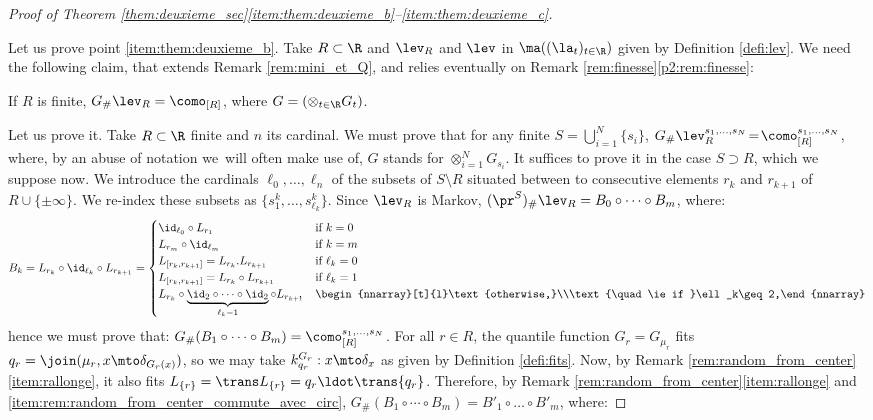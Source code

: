 \begin{proof}[Proof of Theorem \ref{them:deuxieme_sec}\eqref{item:them:deuxieme_b}--\eqref{item:them:deuxieme_c}]\label{proof:them:deuxieme}

Let us prove point \eqref{item:them:deuxieme_b}. Take $R\subset\R$ and $\lev_R$ and $\lev$ in $\ma((\la_t)_{t\in\R})$ given by Definition \ref{defi:lev}. We need the following claim, that extends Remark \ref{rem:mini_et_Q}, and relies eventually on Remark \ref{rem:finesse}\eqref{p2:rem:finesse}:

\begin{claim}
If $R$ is finite, $G_\#\lev_{R}=\como_{[R]}$, where $G=(\otimes_{t\in\R} G_t)$.
\end{claim}

Let us prove it. Take $R\subset\R$ finite and $n$ its cardinal. We must prove that for any finite $S\!=\!\bigcup_{i=1}^N\{s_i\}$, $G_\#\lev_R^{s_1,\ldots,s_N}\!=\!\como_{[R]}^{s_1,\ldots,s_N}$, where, by an abuse of notation we~will often make use of, $G$ stands for $\otimes_{i=1}^N G_{s_i}$. It suffices to prove it in the case $S\supset R$, which we suppose now. We introduce the cardinals $\ell_0,\ldots,\ell_n$ of the subsets of $S\setminus R$ situated between to consecutive elements $r_k$ and $r_{k+1}$ of $R\cup\{\pm\infty\}$. We re-index these subsets as $\{s_1^k,\ldots,s_{\ell_k}^k\}$. Since $\lev_R$ is Markov, $(\pr^S)_\#\lev_R=B_0\circ\cdots\circ B_m$, where:
\begin{align*}
B_k=L_{r_{k}}\circ\id_{\ell_{k}}\circ L_{r_{k+1}}=
\begin{cases}
\id_{\ell_0}\circ L_{r_1}&\text{if }k=0\\
L_{r_m}\circ \id_{\ell_m}&\text{if }k=m\\
L_{[r_k,r_{k+1}]}=L_{r_{k}}. L_{r_{k+1}}&\text{if }\ell_k=0\\
L_{[r_k,r_{k+1}]}=L_{r_{k}}\circ L_{r_{k+1}}&\text{if }\ell_k=1\\
L_{r_{k}}\circ\underbrace{\id_2\circ\cdots\circ\id_2}_{\ell_k-1}\circ L_{r_{k+1}}&\begin{nnarray}[t]{l}\text{otherwise,}\\\text{\quad \ie if }\ell_k\geq 2,\end{nnarray}
\end{cases}
\end{align*}
hence we must prove that: $G_\#(B_1\circ\cdots\circ B_m)=\como_{[R]}^{s_1,\ldots,s_N}$. For all $r\in R$, the quantile function $G_r=G_{\mu_r}$ fits $q_r=\join(\mu_r,x\mto \delta_{G_r(x)})$, so we may take $k^{G_r}_{q_r}:x\mto \delta_x$ as given by Definition \ref{defi:fits}. Now, by Remark \ref{rem:random_from_center}\eqref{item:rallonge}, it also fits $L_{\{r\}}=\trans L_{\{r\}}=q_r\ldot\trans{q_r}$. Therefore, by Remark \ref{rem:random_from_center}\eqref{item:rallonge} and \eqref{item:rem:random_from_center_commute_avec_circ}, $G_\#(B_1\circ\cdots\circ B_m)=B'_1\circ\ldots\circ B'_m$, where:

\end{proof}
